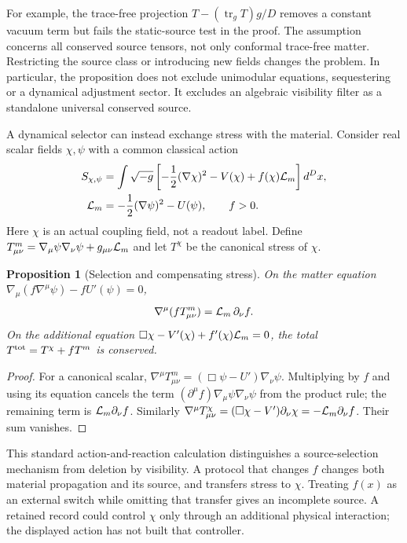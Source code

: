\documentclass[12pt,a4paper]{article}
\newtheorem{proposition}[theorem]{Proposition}
\theoremstyle{definition}
\newcommand{\tr}{\operatorname{tr}}
\begin{document}
For example, the trace-free projection $T-(\tr_gT)g/D$ removes a constant vacuum term but fails the static-source test in the proof.
The assumption concerns all conserved source tensors, not only conformal trace-free matter.
Restricting the source class or introducing new fields changes the problem.
In particular, the proposition does not exclude unimodular equations, sequestering or a dynamical adjustment sector.
It excludes an algebraic visibility filter as a standalone universal conserved source.

A dynamical selector can instead exchange stress with the material.
Consider real scalar fields $\chi,\psi$ with a common classical action
\begin{equation}
 \begin{split}
 S_{\chi,\psi}&=\int\sqrt{-g}\left[-\frac12(\nabla\chi)^2-V(\chi)+f(\chi){\cal L}_m\right]d^Dx,\\
 {\cal L}_m&=-\frac12(\nabla\psi)^2-U(\psi),\qquad f>0 .
 \end{split}
 \label{eq:selector-action}
\end{equation}
Here $\chi$ is an actual coupling field, not a readout label.
Define $T^m_{\mu\nu}=\nabla_\mu\psi\nabla_\nu\psi+g_{\mu\nu}{\cal L}_m$
and let $T^\chi$ be the canonical stress of $\chi$.

\begin{proposition}[Selection and compensating stress]
\label{prop:selector-ward}
On the matter equation $\nabla_\mu(f\nabla^\mu\psi)-fU'(\psi)=0$,
\begin{equation}
 \nabla^\mu(fT^m_{\mu\nu})={\cal L}_m\,\partial_\nu f.
 \label{eq:selector-exchange}
\end{equation}
On the additional equation $\Box\chi-V'(\chi)+f'(\chi){\cal L}_m=0$, the total $T^{\rm tot}=T^\chi+fT^m$ is conserved.
\end{proposition}
\begin{proof}
For a canonical scalar, $\nabla^\mu T^m_{\mu\nu}=(\Box\psi-U')\nabla_\nu\psi$.
Multiplying by $f$ and using its equation cancels the term $(\partial^\mu f)\nabla_\mu\psi\nabla_\nu\psi$ from the product rule; the remaining term is ${\cal L}_m\partial_\nu f$.
Similarly $\nabla^\mu T^\chi_{\mu\nu}=(\Box\chi-V')\partial_\nu\chi=-{\cal L}_m\partial_\nu f$. Their sum vanishes.
\end{proof}

This standard action-and-reaction calculation distinguishes a source-selection mechanism from deletion by visibility.
A protocol that changes $f$ changes both material propagation and its source, and transfers stress to $\chi$.
Treating $f(x)$ as an external switch while omitting that transfer gives an incomplete source.
A retained record could control $\chi$ only through an additional physical interaction; the displayed action has not built that controller.
\end{document}
